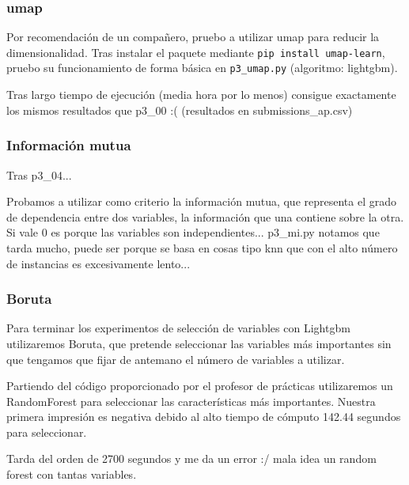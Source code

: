 \documentclass[a4paper, 20pt]{article}
\begin{document}
\subsubsection{umap}
Por recomendación de un compañero, pruebo a utilizar umap para reducir la dimensionalidad. Tras instalar el paquete mediante \texttt{pip install umap-learn}, pruebo su funcionamiento de forma básica en \texttt{p3\_umap.py} (algoritmo: lightgbm).

Tras largo tiempo de ejecución (media hora por lo menos) consigue exactamente los mismos resultados que p3\_00 :( (resultados en submissions\_ap.csv)
\subsubsection{Información mutua}
Tras p3\_04...

Probamos a utilizar como criterio la información mutua, que representa el grado de dependencia entre dos variables, la información que una contiene sobre la otra. Si vale 0 es porque las variables son independientes... p3\_mi.py
notamos que tarda mucho, puede ser porque se basa en cosas tipo knn que con el alto número de instancias es excesivamente lento...

\subsubsection{Boruta}
Para terminar los experimentos de selección de variables con Lightgbm utilizaremos Boruta, que pretende seleccionar las variables más importantes sin que tengamos que fijar de antemano el número de variables a utilizar.

Partiendo del código proporcionado por el profesor de prácticas utilizaremos un RandomForest para seleccionar las características más importantes. Nuestra primera impresión es negativa debido al alto tiempo de cómputo 142.44 segundos para seleccionar.

Tarda del orden de 2700 segundos y me da un error :/ mala idea un random forest con tantas variables.

\printbibliography
\end{document}
